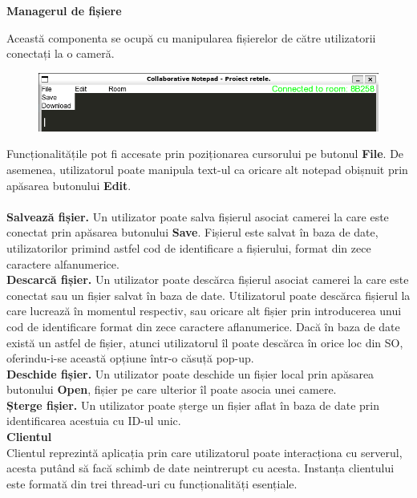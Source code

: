 \documentclass[runningheads]{llncs}
\begin{document}
{\bf \large Managerul de fișiere}

Această componenta se ocupă cu manipularea fișierelor de către utilizatorii conectați la o cameră.

\begin{figure}[htbp!]
    \hspace{-8px} 
    \includegraphics[scale=0.6]{camera3.png}
\end{figure}

Funcționalitățile pot fi accesate prin poziționarea cursorului pe butonul {\bf File}. De asemenea, utilizatorul poate manipula text-ul ca oricare alt notepad obișnuit prin apăsarea butonului
{\bf Edit}.
\\\\

{\bf Salvează fișier.} Un utilizator poate salva fișierul asociat camerei la care este conectat prin apăsarea butonului {\bf Save}. Fișierul este salvat în baza de date, utilizatorilor primind astfel
cod de identificare a fișierului, format din zece carac\-tere alfanumerice.
\\

{\bf Descarcă fișier.} Un utilizator poate descărca fișierul asociat camerei la care este conectat sau un fișier salvat în baza de date. Utilizatorul poate descărca fișierul la care lucrează în momentul respectiv, sau oricare alt
fișier prin introducerea unui cod de identificare format din zece caractere aflanumerice. Dacă în baza de date există un astfel de fișier, atunci utilizatorul îl poate descărca în orice loc din SO, oferindu-i-se această opțiune într-o căsuță pop-up.
\\

{\bf Deschide fișier.} Un utilizator poate deschide un fișier local prin apăsarea butonului {\bf Open}, fișier pe care ulterior îl poate asocia unei camere.
\\

{\bf Șterge fișier.} Un utilizator poate șterge un fișier aflat în baza de date prin identificarea acestuia cu ID-ul unic.
\\

\newpage
{\bf \large Clientul}
\\

Clientul reprezintă aplicația prin care utilizatorul poate interacționa cu serverul, acesta putând să facă schimb de date neintrerupt cu acesta.
Instanța clientului este formată din trei thread-uri cu funcționalități esențiale.
\end{document}

